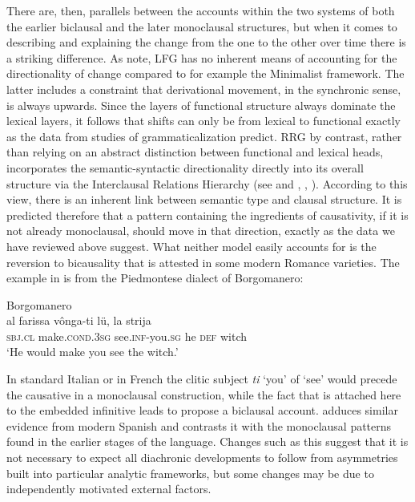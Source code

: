 \documentclass[output=paper,hidelinks]{langscibook}
\begin{document}
There are, then, parallels between the accounts within the two systems of both the earlier biclausal and the later monoclausal structures, but when it comes to describing and explaining the change from the one to the other over time there is a striking difference. As \citet[659]{borjars2017lexical} note, LFG has no inherent means of accounting for the directionality of change compared to for example the Minimalist framework. The latter includes a constraint that derivational movement, in the synchronic sense, is always upwards. Since the layers of functional structure always dominate the lexical layers, it follows that shifts can only be from lexical to functional exactly as the data from studies of grammaticalization predict. RRG by contrast, rather than relying on an abstract distinction between functional and lexical heads, incorporates the semantic-syntactic directionality directly into its overall structure via the Interclausal Relations Hierarchy (see  and \citealt[209]{VanValin2005}, \citealt[Fig~28.20]{VanValin2010}, \citealt{Matasovic2008}). According to this view, there is an inherent link between semantic type and clausal structure. It is predicted therefore that a pattern containing the ingredients of causativity, if it is not already monoclausal, should move in that direction, exactly as the data we have reviewed above suggest. What neither model easily accounts for is the reversion to bicausality that is attested in some modern Romance varieties. The example in  is from the Piedmontese dialect of Borgomanero:

\ea%
   \label{ex:RRG:48} Borgomanero \citep[155,~ex.~154d]{Tortora2014}\\
   \gll al   farissa      vônga-ti      lü,   la   strija\\
     \textsc{sbj.cl}  make.\textsc{cond.3sg}  see.\textsc{inf}{}-you.\textsc{sg}   he   \textsc{def}  witch \\
   \glt `He would make you see the witch.'
   \z

In standard Italian or in French the clitic subject \textit{ti} `you' of `see' would precede the causative in a monoclausal construction, while the fact that is attached here to the embedded infinitive leads \citet{Tortora2014} to propose a biclausal account. \citet{Davies1995} adduces similar evidence from modern Spanish and contrasts it with the monoclausal patterns found in the earlier stages of the language. Changes such as this suggest that it is not necessary to expect all diachronic developments to follow from asymmetries built into particular analytic frameworks, but some changes may be due to independently motivated external factors.
\end{document}
